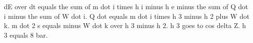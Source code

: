 dE over dt equals the sum of m dot i times h i minus h e minus the sum of Q dot i minus the sum of W dot i. 
Q dot equals m dot i times h 3 minus h 2 plus W dot k. 
m dot 2 s equals minus W dot k over h 3 minus h 2. 
h 3 goes to cos delta Z. 
h 3 equals 8 bar.